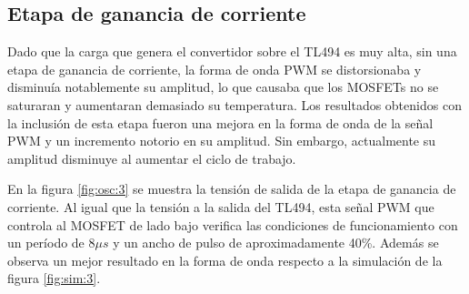 


\subsection{Etapa de ganancia de corriente}




Dado que la carga que genera el convertidor sobre el TL494 es muy alta, sin una etapa de ganancia de corriente, la forma de onda PWM 
se distorsionaba y disminuía notablemente su amplitud, lo que causaba que los MOSFETs no se saturaran y aumentaran demasiado su temperatura.
Los resultados obtenidos con la inclusión de esta etapa fueron una mejora en la forma de onda de la señal PWM y un incremento notorio en su amplitud.
Sin embargo, actualmente su amplitud disminuye al aumentar el ciclo de trabajo.

En la figura \ref{fig:osc:3} se muestra la tensión de salida de la etapa de ganancia de corriente.
Al igual que la tensión a la salida del TL494, esta señal PWM que controla al MOSFET de lado bajo verifica las condiciones de funcionamiento con un período de $8\mu s$ y un ancho de pulso de aproximadamente 40\%.
Además se observa un mejor resultado en la forma de onda respecto a la simulación de la figura \ref{fig:sim:3}. %


